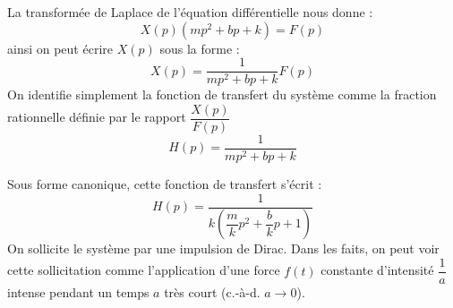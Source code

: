La transformée de Laplace de l'équation différentielle nous donne : 
\[
    X(p)\left(mp^2+bp+k\right)=F(p)
\]
ainsi on peut écrire $X(p)$ sous la forme :
\[
    X(p)=\dfrac{1}{mp^2+bp+k}F(p)
\]
On identifie simplement la fonction de transfert du système comme la fraction 
rationnelle définie par le rapport $\dfrac{X(p)}{F(p)}$
\[
    H(p)=\dfrac{1}{mp^2+bp+k}
\]

Sous forme canonique, cette fonction de transfert s'écrit :
\[
    H(p)=\dfrac{1}{k\left(\dfrac{m}{k}p^2+\dfrac{b}{k}p+1\right)}
\]
On sollicite le système par une impulsion de Dirac. Dans les faits, on peut 
voir cette sollicitation comme l'application d'une force $f(t)$ constante 
d'intensité $\dfrac{1}{a}$ intense pendant un temps $a$ très court 
(c.-à-d. $a\to0$).    

